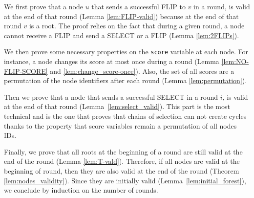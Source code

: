 \documentclass[twocolumn]{article}
\begin{document}
We first prove that a node $u$ that sends a successful FLIP to $v$
in a round, is valid at the end of that round
(Lemma \ref{lem:FLIP-valid}) because at the end of that round $v$ is a root.
The proof relies on the fact that during a given round, a node cannot receive a FLIP and send a SELECT or a FLIP
(Lemma  \ref{lem:2FLIPs}). 

We then prove some necessary properties on the {\tt score} variable at each node.
For instance, a node changes its score at most once during a round
(Lemma \ref{lem:NO-FLIP-SCORE} and \ref{lem:change_score-once}).
Also, the set of all scores are a permutation of the node identifiers after each round (Lemma \ref{lem:permutation}).

Then we prove that a node that sends a successful SELECT in a round $i$, is valid at the end of that 
round (Lemma~\ref{lem:select_valid}). This part is the most technical and is the one that proves that chains of selection can not create cycles thanks to the property that score variables remain a permutation of all nodes IDs.

Finally, we prove that all roots at the beginning of a round
are still valid at the end of the round (Lemma \ref{lem:T-vald}).
Therefore, if all nodes are valid at the beginning of round, 
then they are also valid at the end of the round 
(Theorem \ref{lem:nodes_validity}). Since they are initially valid (Lemma~\ref{lem:initial_forest}), we conclude by induction on the number of rounds.
\end{document}

